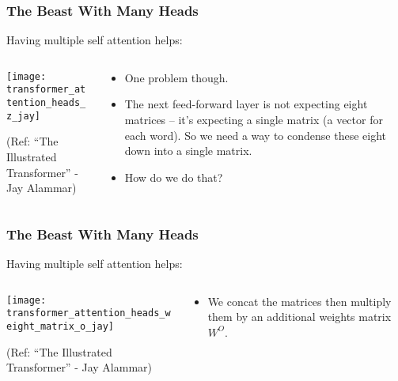 \begin{frame}[fragile]\frametitle{The Beast With Many Heads}

Having multiple self attention helps:

\begin{columns}
    \begin{column}[T]{0.5\linewidth}
\begin{center}
\texttt{[image: transformer\_attention\_heads\_z\_jay]}


{\tiny (Ref: ``The Illustrated Transformer'' - Jay Alammar)}
\end{center}		

		\end{column}
    \begin{column}[T]{0.5\linewidth}

\begin{itemize}
\item One problem though. 
\item The next feed-forward layer is not expecting eight matrices – it’s expecting a single matrix (a vector for each word). So we need a way to condense these eight down into a single matrix.
\item How do we do that? 
\end{itemize}
    \end{column}
  \end{columns}
\end{frame}

\begin{frame}[fragile]\frametitle{The Beast With Many Heads}

Having multiple self attention helps:

\begin{columns}
    \begin{column}[T]{0.5\linewidth}
\begin{center}
\texttt{[image: transformer\_attention\_heads\_weight\_matrix\_o\_jay]}


{\tiny (Ref: ``The Illustrated Transformer'' - Jay Alammar)}
\end{center}		

		\end{column}
    \begin{column}[T]{0.5\linewidth}

\begin{itemize}
\item  We concat the matrices then multiply them by an additional weights matrix $W^O$.
\end{itemize}
    \end{column}
  \end{columns}
\end{frame}


